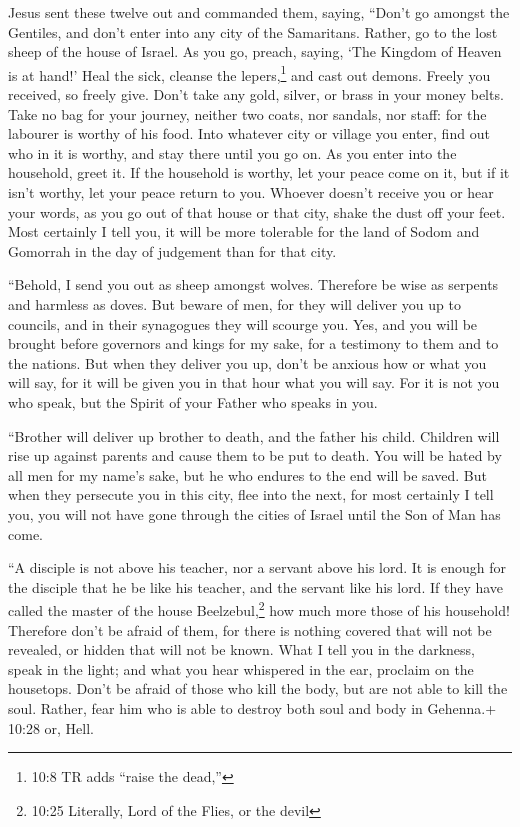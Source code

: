  Jesus sent these twelve out and commanded them, saying,
``Don't go amongst the Gentiles, and don't enter into any city of the
Samaritans.  Rather, go to the lost sheep of the house of
Israel.  As you go, preach, saying, `The Kingdom of Heaven
is at hand!'  Heal the sick, cleanse the lepers,\footnote{10:8
  TR adds ``raise the dead,''} and cast out demons. Freely you received,
so freely give.  Don't take any gold, silver, or brass in
your money belts.  Take no bag for your journey, neither
two coats, nor sandals, nor staff: for the labourer is worthy of his
food.  Into whatever city or village you enter, find out
who in it is worthy, and stay there until you go on.  As
you enter into the household, greet it.  If the household
is worthy, let your peace come on it, but if it isn't worthy, let your
peace return to you.  Whoever doesn't receive you or hear
your words, as you go out of that house or that city, shake the dust off
your feet.  Most certainly I tell you, it will be more
tolerable for the land of Sodom and Gomorrah in the day of judgement
than for that city.

 ``Behold, I send you out as sheep amongst wolves.
Therefore be wise as serpents and harmless as doves.  But
beware of men, for they will deliver you up to councils, and in their
synagogues they will scourge you.  Yes, and you will be
brought before governors and kings for my sake, for a testimony to them
and to the nations.  But when they deliver you up, don't be
anxious how or what you will say, for it will be given you in that hour
what you will say.  For it is not you who speak, but the
Spirit of your Father who speaks in you.

 ``Brother will deliver up brother to death, and the father
his child. Children will rise up against parents and cause them to be
put to death.  You will be hated by all men for my name's
sake, but he who endures to the end will be saved.  But
when they persecute you in this city, flee into the next, for most
certainly I tell you, you will not have gone through the cities of
Israel until the Son of Man has come.

 ``A disciple is not above his teacher, nor a servant above
his lord.  It is enough for the disciple that he be like
his teacher, and the servant like his lord. If they have called the
master of the house Beelzebul,\footnote{10:25 Literally, Lord of the
  Flies, or the devil} how much more those of his household!
 Therefore don't be afraid of them, for there is nothing
covered that will not be revealed, or hidden that will not be known.
 What I tell you in the darkness, speak in the light; and
what you hear whispered in the ear, proclaim on the housetops.
 Don't be afraid of those who kill the body, but are not
able to kill the soul. Rather, fear him who is able to destroy both soul
and body in Gehenna.+ 10:28 or, Hell.

